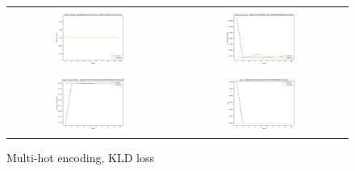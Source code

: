 \begin{appendices}
        \begin{figure}[H]
            \centering
            \begin{tabular}{cc}
                \includegraphics[width=0.48\textwidth]{figures/training_plots/ModelB-(1D)-MultiHot-KLD-ADAM_10-04-2019_02-53-03_AON-accuracy.pdf} & \includegraphics[width=0.48\textwidth]{figures/training_plots/ModelB-(1D)-MultiHot-KLD-ADAM_10-04-2019_02-53-03_binary-accuracy.pdf} \\
                \includegraphics[width=0.48\textwidth]{figures/training_plots/ModelB-(1D)-MultiHot-KLD-ADAM_10-04-2019_02-53-03_binary-cross-entropy.pdf} & \includegraphics[width=0.48\textwidth]{figures/training_plots/ModelB-(1D)-MultiHot-KLD-ADAM_10-04-2019_02-53-03_loss.pdf}
            \end{tabular}
            \caption*{Multi-hot encoding, KLD loss}
        \end{figure}
        

\end{appendices}
